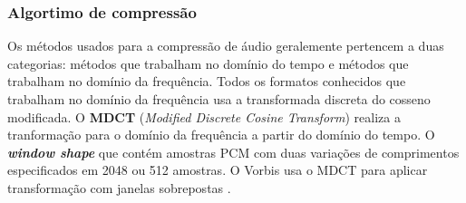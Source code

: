 \subsubsection{Algortimo de compressão}

Os métodos usados para a compressão de áudio geralemente pertencem a duas categorias: métodos que trabalham no domínio do tempo e métodos que trabalham no domínio da frequência. Todos os formatos conhecidos que trabalham no domínio da frequência usa a transformada discreta do cosseno modificada. O \textbf{MDCT} (\textit{Modified Discrete Cosine Transform}) realiza a tranformação para o domínio da frequência a partir do domínio do tempo. O \textbf{\textit{window shape}} que contém amostras PCM com duas variações de comprimentos especificados em 2048 ou 512 amostras. O Vorbis usa o MDCT para aplicar transformação com janelas sobrepostas \cite{vorbis}. 







